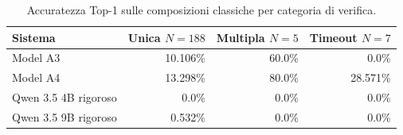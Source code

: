 \begin{table}[H]
\centering
\small
\caption{Accuratezza Top-1 sulle composizioni classiche per categoria di verifica.}
\label{tab:classic-by-verification}
\begin{tabular}{lrrr}
\toprule
Sistema & Unica \(N=188\) & Multipla \(N=5\) & Timeout \(N=7\) \\
\midrule
Model A3 & 10.106\% & 60.0\% & 0.0\% \\
Model A4 & 13.298\% & 80.0\% & 28.571\% \\
Qwen 3.5 4B rigoroso & 0.0\% & 0.0\% & 0.0\% \\
Qwen 3.5 9B rigoroso & 0.532\% & 0.0\% & 0.0\% \\
\bottomrule
\end{tabular}
\end{table}
